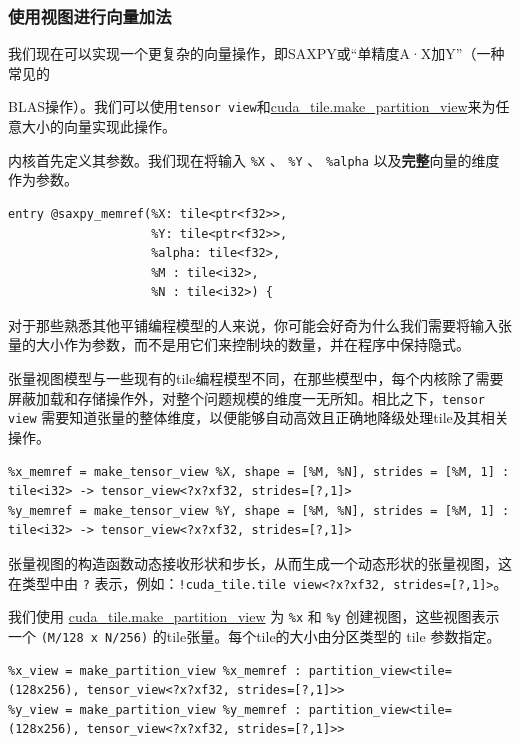 \documentclass{article}
\begin{document}
\subsubsection{使用视图进行向量加法}

我们现在可以实现一个更复杂的向量操作，即SAXPY或``单精度A·X加Y''（一种常见的

BLAS操作）。我们可以使用\texttt{tensor view}和\href{https://docs.nvidia.com/cuda/tile-ir/latest/sections/operations.html#op-cuda-tile-make-partition-view}{cuda\_tile.make\_partition\_view}来为任意大小的向量实现此操作。


内核首先定义其参数。我们现在将输入 \texttt{\%X} 、 \texttt{\%Y} 、 \texttt{\%alpha} 以及\textbf{完整}向量的维度作为参数。


\begin{lstlisting}
entry @saxpy_memref(%X: tile<ptr<f32>>,
                    %Y: tile<ptr<f32>>,
                    %alpha: tile<f32>,
                    %M : tile<i32>,
                    %N : tile<i32>) {
\end{lstlisting}

对于那些熟悉其他平铺编程模型的人来说，你可能会好奇为什么我们需要将输入张量的大小作为参数，而不是用它们来控制块的数量，并在程序中保持隐式。


张量视图模型与一些现有的tile编程模型不同，在那些模型中，每个内核除了需要屏蔽加载和存储操作外，对整个问题规模的维度一无所知。相比之下，\texttt{tensor view} 需要知道张量的整体维度，以便能够自动高效且正确地降级处理tile及其相关操作。


\begin{lstlisting}
%x_memref = make_tensor_view %X, shape = [%M, %N], strides = [%M, 1] : tile<i32> -> tensor_view<?x?xf32, strides=[?,1]>
%y_memref = make_tensor_view %Y, shape = [%M, %N], strides = [%M, 1] : tile<i32> -> tensor_view<?x?xf32, strides=[?,1]>
\end{lstlisting}

张量视图的构造函数动态接收形状和步长，从而生成一个动态形状的张量视图，这在类型中由 \texttt{?} 表示，例如：\texttt{!cuda\_tile.tile view<?x?xf32, strides=[?,1]>}。


我们使用 \href{https://docs.nvidia.com/cuda/tile-ir/latest/sections/operations.html#op-cuda-tile-make-partition-view}{cuda\_tile.make\_partition\_view} 为 \texttt{\%x} 和 \texttt{\%y} 创建视图，这些视图表示一个 \texttt{(M/128 x N/256)} 的tile张量。每个tile的大小由分区类型的 tile 参数指定。


\begin{lstlisting}
%x_view = make_partition_view %x_memref : partition_view<tile=(128x256), tensor_view<?x?xf32, strides=[?,1]>>
%y_view = make_partition_view %y_memref : partition_view<tile=(128x256), tensor_view<?x?xf32, strides=[?,1]>>
\end{lstlisting}
\end{document}
